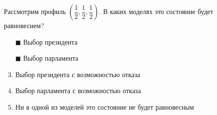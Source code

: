 Рассмотрим профиль $\left(\dfrac{1}{2}, \dfrac{1}{2}, \dfrac{1}{2}\right)$. В каких моделях это состояние будет равновесием?
\begin{enumerate}[label=$\square$]
	
	
	
	
	\item[$\blacksquare$] Выбор президента %
	\item[$\blacksquare$] Выбор парламента
	\item Выбор президента с возможностью отказа
	\item Выбор парламента с возможностью отказа
	\item Ни в одной из моделей это состояние не будет равновесным
\end{enumerate}

